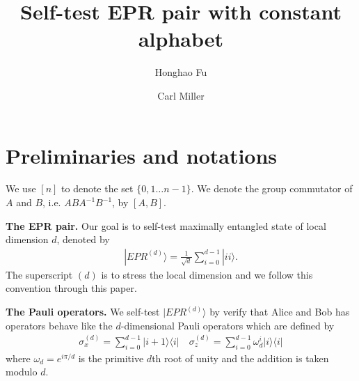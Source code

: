 \documentclass[11pt,letterpaper]{article}
\newcommand{\ket}[1]{|#1\rangle}
\newcommand{\ketbra}[2]{|#1\rangle\langle#2|}
\newcommand{\1}{\mathbb{1}}
\newcommand{\EPR}[1]{EPR^{(#1)}}
\newcommand{\paulix}[1]{\sigma_x^{(#1)}}
\newcommand{\pauliz}[1]{\sigma_z^{(#1)}}
\theoremstyle{definition}
\begin{document}
\title{Self-test EPR pair with constant alphabet}

\author[1]{Honghao Fu}
\author[1,2]{Carl Miller}

\renewcommand\Affilfont{\itshape\small}


\maketitle
\section{Preliminaries and notations}
We use $[n]$ to denote the set $\{0,1 \dots n-1\}$.
We denote the group commutator of $A$ and $B$, i.e. $ABA^{-1}B^{-1}$, by $[A,B]$.

\textbf{The EPR pair.} Our goal is to self-test maximally entangled state of local dimension $d$, denoted by 
\begin{align}
\ket{\EPR{d}} = \frac{1}{\sqrt{d}} \sum_{i = 0}^{d-1} \ket{ii}.
\end{align}
The superscript $(d)$ is to stress the local dimension and we follow this convention through this paper.

\textbf{The Pauli operators.} 
We self-test $\ket{\EPR{d}}$ by verify that Alice and Bob has operators behave like 
the $d$-dimensional Pauli operators which are defined by
\begin{align}
	\paulix{d} = \sum_{i=0}^{d-1} \ketbra{i+1}{i} \quad \pauliz{d} = \sum_{i=0}^{d-1} \omega_d^i\ketbra{i}{i}
\end{align}
where $\omega_d = e^{i\pi/d}$ is the primitive $d$th root of unity and the addition is taken modulo $d$.
\end{document}
